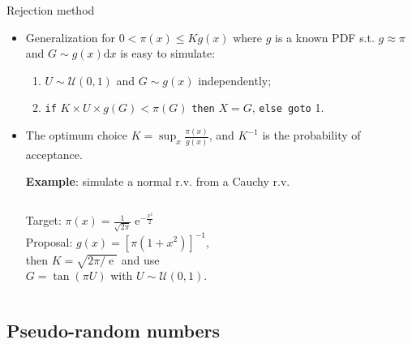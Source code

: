 \documentclass{beamer}
\newcommand{\id}{\mathrm{d}}
\newcommand{\iexp}{\operatorname{e}}
\newcommand{\demi}{\frac{1}{2}}
\newcommand{\Ugj}{U}
\newcommand{\PDFU}{{\mathcal U}}
\begin{document}
\begin{frame}{Rejection method}

\begin{itemize}
\item Generalization for $0<\pi(x)\leq K g(x)$ where $g$ is a known PDF s.t. $g\approx\pi$ and $G\sim g(x)\id x$ is easy to simulate:
\begin{enumerate}
 \item $\Ugj\sim\PDFU(0,1)$ and $G\sim g(x)$ independently;
 \item \texttt{if} $K\times\Ugj\times g(G)<\pi(G)$ \texttt{then} $X=G$, \texttt{else goto} 1.
\end{enumerate}
\item The optimum choice $K=\sup_{x}\frac{\pi(x)}{g(x)}$, and $K^{-1}$ is the probability of acceptance.\\
\vspace{0.2truecm}
\footnotesize{{\bf Example}: simulate a normal r.v. from a Cauchy r.v.%
\begin{columns}
\hspace*{1.5truecm} Target: $\pi(x)=\frac{1}{\sqrt{2\pi}}\iexp^{-\frac{x^2}{2}}$ \\ \hspace*{1.5truecm} Proposal: $g(x)=[\pi(1+x^2)]^{-1}$, \\ \hspace*{1.5truecm} then $K=\sqrt{2\pi/\iexp}$ and use \\ \hspace*{1.5truecm} $G=\tan(\pi U)$ with $U\sim\PDFU(0,1)$.
\end{columns}}
\end{itemize}

\end{frame}

\subsection{Pseudo-random numbers}
\end{document}
